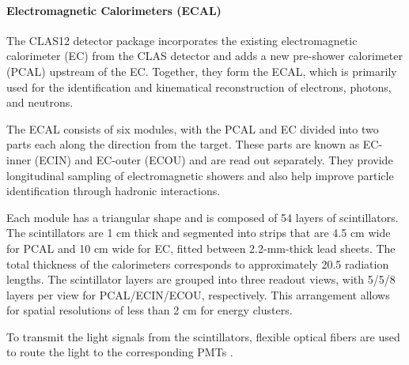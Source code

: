 \paragraph{Electromagnetic Calorimeters (ECAL)}
\label{par::ecal}
    The CLAS12 detector package incorporates the existing electromagnetic calorimeter (EC) from the CLAS detector and adds a new pre-shower calorimeter (PCAL) upstream of the EC.
    Together, they form the ECAL, which is primarily used for the identification and kinematical reconstruction of electrons, photons, and neutrons.

    The ECAL consists of six modules, with the PCAL and EC divided into two parts each along the direction from the target.
    These parts are known as EC-inner (ECIN) and EC-outer (ECOU) and are read out separately.
    They provide longitudinal sampling of electromagnetic showers and also help improve particle identification through hadronic interactions.

    Each module has a triangular shape and is composed of 54 layers of scintillators.
    The scintillators are 1 cm thick and segmented into strips that are 4.5 cm wide for PCAL and 10 cm wide for EC, fitted between 2.2-mm-thick lead sheets.
    The total thickness of the calorimeters corresponds to approximately 20.5 radiation lengths.
    The scintillator layers are grouped into three readout views, with 5/5/8 layers per view for PCAL/ECIN/ECOU, respectively.
    This arrangement allows for spatial resolutions of less than 2 cm for energy clusters.

    To transmit the light signals from the scintillators, flexible optical fibers are used to route the light to the corresponding PMTs \cite{asryan2020}.
